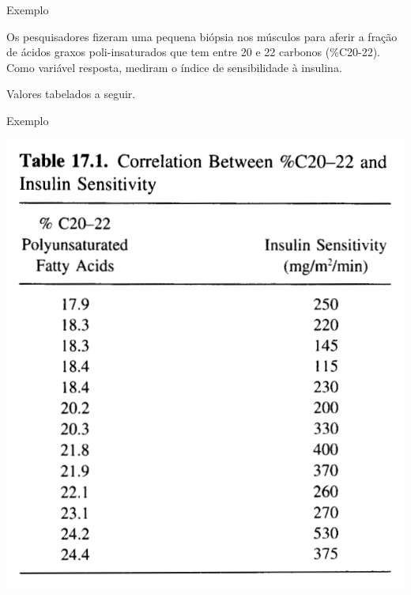 \documentclass{beamer}
\begin{document}
\begin{frame}{Exemplo}
  \begin{example}
    Os pesquisadores fizeram uma pequena biópsia nos músculos para
    aferir a fração de ácidos graxos poli-insaturados que tem entre 20
    e 22 carbonos (\%C20-22). Como variável resposta, mediram o índice
    de sensibilidade à insulina.
  \end{example}
  Valores tabelados a seguir.
\end{frame}

\begin{frame}{Exemplo}
  \begin{center}
      \includegraphics[height=0.8\textheight]{Assoc/table}
  \end{center}
\end{frame}
\end{document}
